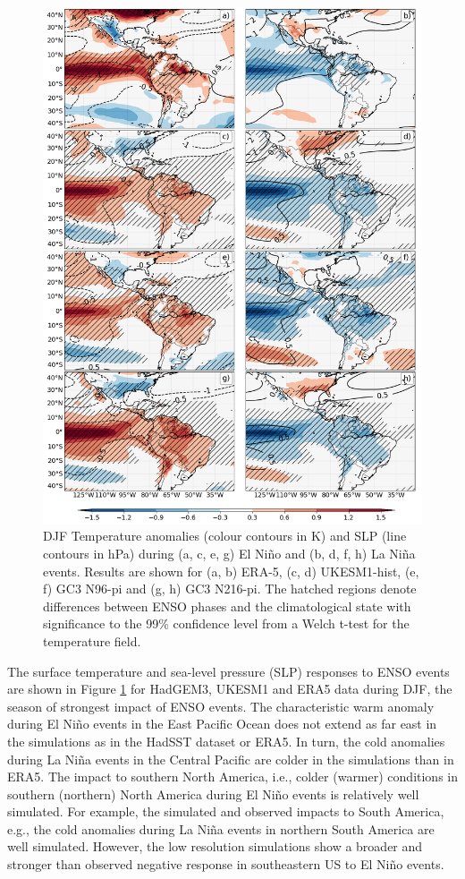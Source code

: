 \begin{figure}[t!]
\centering
 \includegraphics[width=0.81\linewidth]{figures/ensotemp_3}
\caption[ENSO teleconnections of temperature and SLP to the region of the AMS]{ DJF Temperature anomalies (colour contours in K) and SLP (line contours in hPa) during (a, c, e, g) El Ni\~no and (b, d, f, h) La Ni\~na events. Results are shown for (a, b) ERA-5, (c, d) UKESM1-hist, (e, f) GC3 N96-pi and (g, h) GC3 N216-pi. The hatched regions denote differences between ENSO phases and the climatological state with significance to the 99\% confidence level from a Welch t-test for the temperature field. }
\label{fig:10}
\end{figure}

The surface temperature and sea-level pressure (SLP) responses to ENSO events are shown in Figure \ref{fig:10} for HadGEM3, UKESM1 and ERA5 data during DJF, the season of strongest impact of ENSO events.
The characteristic warm anomaly during El Ni\~no events in the East Pacific Ocean does not extend as far east in the simulations as in the HadSST dataset or ERA5. In turn, the cold anomalies during La Ni\~na events in the Central Pacific are colder in the simulations than in ERA5. 
The impact to southern North America, i.e., colder (warmer) conditions in southern (northern) North America during El Ni\~no events is relatively well simulated. For example, the simulated and observed impacts to South America, e.g., the cold anomalies during La Ni\~na events in northern South America are well simulated. However, the low resolution simulations show a broader and stronger than observed negative response in southeastern US to El Ni\~no events. 

